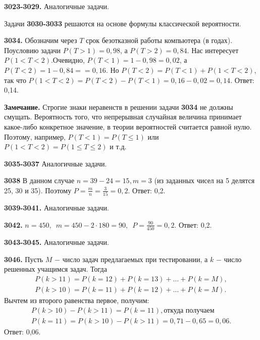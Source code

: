 \textbf{3023-3029.} Аналогичные задачи.

Задачи \textbf{3030-3033} решаются на основе формулы классической вероятности.

\textbf{3034.} Обозначим через $T$ срок безотказной работы компьютера (в годах). Поусловию задачи $P(T>1)=0,98$, а $P(T>2)=0,84.$ Нас интересует $P(1<T<2)$.\newline Очевидно, $P(T<1)=1-0,98=0,02$, а $P(T<2)=1-0,84=$\newline$=0,16$. Но $P(T<2)=P(T<1)+P(1<T<2)$, так что \newline$P(1<T<2)=P(T<2)-P(T<1)=0,16-0,02=0,14.$ \newline \null \hspace*{\fill} Ответ: 0,14. 

\textbf{Замечание.} Строгие знаки неравенств в решении задачи \textbf{3034} не должны смущать. Вероятность того, что непрерывная случайная величина принимает какое-либо конкретное значение, в теории вероятностей считается равной нулю. Поэтому, например, $P(T<1)=P(T\leq1)$ или $P(1<T<2)=P(1\leq T\leq2)$ и т.д.

\textbf{3035-3037} Аналогичные задачи.

\textbf{3038} В данном случае $n=39-24=15, m=3$ (из заданных чисел на 5 делятся 25, 30 и 35). Поэтому $P=\frac{m}{n}=\frac{3}{15}=0,2$. \newline \null \hspace*{\fill} Ответ: 0,2. 

\textbf{3039-3041.} Аналогичные задачи.

\textbf{3042.} $n=450,\enspace m=450-2\cdot180=90,\enspace P=\frac{90}{450}=0,2.$ \newline \null \hspace*{\fill} Ответ: 0,2. 

\textbf{3043-3045.} Аналогичные задачи.

\textbf{3046.} Пусть $M$ $-$ число задач предлагаемых при тестировании, а $k$ $-$ число решенных учащимся задач. Тогда
\begin{eqnarray*}
	P(k>11)=P(k=12)+P(k=13)+\dots+P(k=M),\\
	P(k>10)=P(k=11)+P(k=12)+\dots+P(k=M).
\end{eqnarray*}
Вычтем из второго равенства первое, получим:
\begin{eqnarray*}
	P(k>10)-P(k>11)=P(k=11), \text{откуда получаем}\\
	P(k=11)=P(k>10)-P(k>11)=0,71-0,65=0,06.
\end{eqnarray*}
\newline \null \hspace*{\fill} Ответ: 0,06. 

